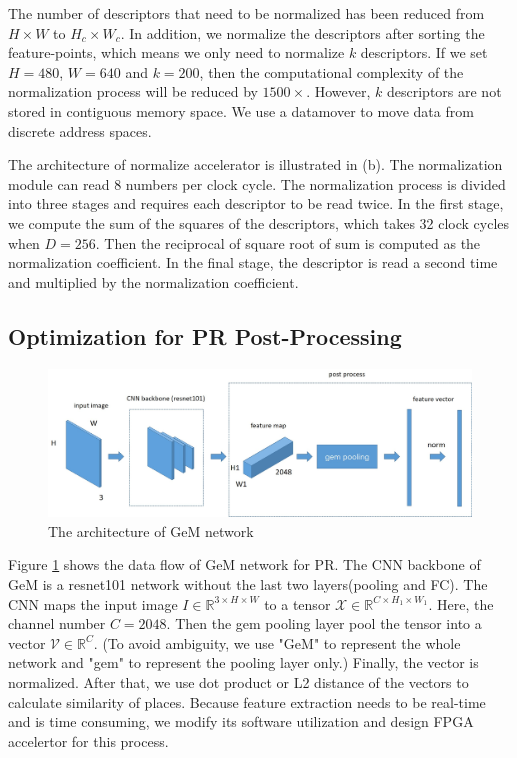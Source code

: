 The number of descriptors that need to be normalized has been reduced from $H\times W$ to $H_c\times W_c$. In addition, we normalize the descriptors after sorting the feature-points, which means we only need to normalize $k$ descriptors. If we set $H=480$, $W=640$ and $k=200$, then the computational complexity of the normalization process will be reduced by $1500\times$. However, $k$ descriptors are not stored in contiguous memory space. We use a datamover to move data from discrete address spaces.

The architecture of normalize accelerator is illustrated in (b). The normalization module can read 8 numbers per clock cycle. The normalization process is divided into three stages and requires each descriptor to be read twice. In the first stage, we compute the sum of the squares of the descriptors, which takes 32 clock cycles when $D=256$. Then the reciprocal of square root of sum is computed as the normalization coefficient. In the final stage, the descriptor is read a second time and multiplied by the normalization coefficient.

\subsection{Optimization for PR Post-Processing}

\begin{figure}[t]
    \centering
    \includegraphics[width=1\linewidth]{fig/pr.eps}
    \caption{The architecture of GeM network}
    \label{fig:gem}
\end{figure}

Figure \ref{fig:gem} shows the data flow of GeM network \cite{gem} for PR. The CNN backbone of GeM is a resnet101 network without the last two layers(pooling and FC). The CNN maps the input image $ I \in \mathbb{R}^{3 \times H \times W}$ to a tensor $\mathcal{X} \in \mathbb{R}^{C \times H_1 \times W_1}$. Here, the channel number $C = 2048$. Then the gem pooling layer pool the tensor into a vector $\mathcal{V} \in \mathbb{R}^{C}$. (To avoid ambiguity, we use "GeM" to represent the whole network and "gem" to represent the pooling layer only.) Finally, the vector is normalized. After that, we use dot product or L2 distance of the vectors to calculate similarity of places. Because feature extraction needs to be real-time and is time consuming, we modify its software utilization and design FPGA accelertor for this process.

